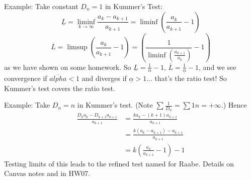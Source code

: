 \documentclass{article}
\theoremstyle{plain}
\theoremstyle{remark}
\begin{document}
Example: Take constant $D_n = 1$ in Kummer's Test:
\[
	\underline{L} = \liminf_{k \to \infty} \frac{a_k - a_{k+1}}{a_{k+1}}
	= \liminf \left(\frac{a_k}{a_{k+1}} - 1\right)
\]
\[
	\overline{L} = \limsup \left(\frac{a_k}{a_{k+1}} - 1\right)
	= \left( \frac{1}{\liminf\left(\frac{a_{k+1}}{a_k}\right)} - 1\right)
\]
as we have shown on some homework.
So $\underline{L} = \frac{1}{\overline{\alpha}} - 1$,
$\overline{L} = \frac{1}{\underline{\alpha}} - 1$,
and we see convergence if $\overline{alpha} < 1$ and diverges if $\underline{\alpha} > 1$...
that's the ratio test!
So Kummer's test covers the ratio test.

Example: Take $D_n = n$ in Kummer's test.
(Note $\sum\frac{1}{D_n} = \sum{1}{n} = +\infty$.)
Hence
\begin{align*}
	\frac{D_ka_k - D_{k+1}a_{k+1}}{a_{k+1}}
	&= \frac{ka_k - (k+1)a_{k+1}}{a_{k+1}}\\
	&= \frac{k(a_k - a_{k+1}) - a_{k+1}}{a_{k+1}}\\
	&= k\left(\frac{a_k}{a_{k+1}} - 1\right) - 1
\end{align*}
Testing limits of this leads to the refined test named for Raabe.
Details on Canvas notes and in HW07.
\end{document}
